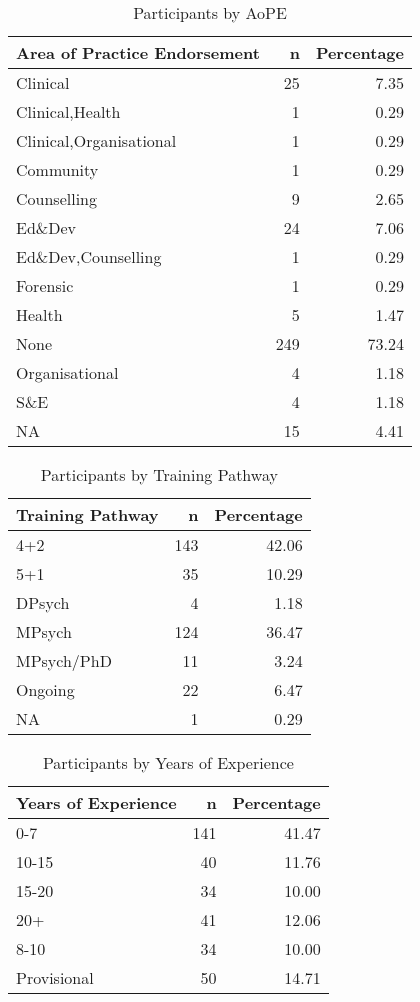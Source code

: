 \documentclass[
  english,
  man]{apa6}
\begin{document}
\begin{table}

\caption{\label{tab:aopeParticipants}Participants by AoPE}
\centering
\begin{tabular}[t]{l|r|r}
\hline
Area of Practice Endorsement & n & Percentage\\
\hline
Clinical & 25 & 7.35\\
\hline
Clinical,Health & 1 & 0.29\\
\hline
Clinical,Organisational & 1 & 0.29\\
\hline
Community & 1 & 0.29\\
\hline
Counselling & 9 & 2.65\\
\hline
Ed\&Dev & 24 & 7.06\\
\hline
Ed\&Dev,Counselling & 1 & 0.29\\
\hline
Forensic & 1 & 0.29\\
\hline
Health & 5 & 1.47\\
\hline
None & 249 & 73.24\\
\hline
Organisational & 4 & 1.18\\
\hline
S\&E & 4 & 1.18\\
\hline
NA & 15 & 4.41\\
\hline
\end{tabular}
\end{table}

\begin{table}

\caption{\label{tab:trainingPathwayParticipants}Participants by Training Pathway}
\centering
\begin{tabular}[t]{l|r|r}
\hline
Training Pathway & n & Percentage\\
\hline
4+2 & 143 & 42.06\\
\hline
5+1 & 35 & 10.29\\
\hline
DPsych & 4 & 1.18\\
\hline
MPsych & 124 & 36.47\\
\hline
MPsych/PhD & 11 & 3.24\\
\hline
Ongoing & 22 & 6.47\\
\hline
NA & 1 & 0.29\\
\hline
\end{tabular}
\end{table}

\begin{table}

\caption{\label{tab:yearsExperienceParticipants}Participants by Years of Experience}
\centering
\begin{tabular}[t]{l|r|r}
\hline
Years of Experience & n & Percentage\\
\hline
0-7 & 141 & 41.47\\
\hline
10-15 & 40 & 11.76\\
\hline
15-20 & 34 & 10.00\\
\hline
20+ & 41 & 12.06\\
\hline
8-10 & 34 & 10.00\\
\hline
Provisional & 50 & 14.71\\
\hline
\end{tabular}
\end{table}
\end{document}
